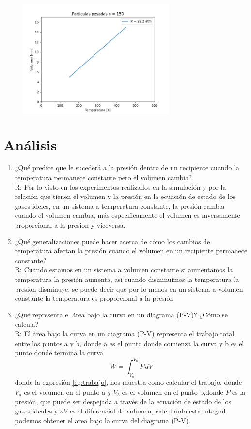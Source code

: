 \documentclass[]{article}
\begin{document}
\begin{figure}[H]
	\raggedright
	\includegraphics[width=8cm, height=6cm]{graficos/grafico9.pdf}
\end{figure}


\section{Análisis}
\begin{enumerate}
      \item ¿Qué predice que le sucederá a la presión dentro de un recipiente cuando la temperatura permanece constante pero el volumen cambia?\\
             R: Por lo visto en los experimentos realizados en la simulación y por la relación que tienen el volumen y la presión en la ecuación de estado de                los gases ideles, en un sistema a temperatura constante, la presión cambia cuando el volumen cambia, más especificamente el volumen es inversamente proporcional a la presion y viceversa.\\   
       \item ¿Qué generalizaciones puede hacer acerca de cómo los cambios de temperatura afectan la presión cuando el volumen en un recipiente permanece                                        constante?\\
             R: Cuando estamos en un sistema a volumen constante si aumentamos la temperatura la presión aumenta, asi cuando disminuimos la temperatura la presion disminuye, se puede decir que por lo menos en un sistema a volumen constante la temperatura es proporcional a la presión\\ 
      \item ¿Qué representa el área bajo la curva en un diagrama (P-V)? ¿Cómo se calcula?\\
             R: El área bajo la curva en un diagrama (P-V) representa el trabajo total entre los puntos a y b, donde a es el punto donde comienza la curva y b es el punto donde termina la curva
             \begin{equation}\label{eq:trabajo}
             W = \int_{V_a}^{V_b} \! P \, dV 
             \end{equation}
             donde la expresión \ref{eq:trabajo}, nos muestra como calcular el trabajo, donde $V_a$ es el volumen en el punto a y $V_b$ es el volumen en el punto b,donde $P$ es la presión, que puede ser despejada a través de la ecuación de estado de los gases ideales y $dV$ es el diferencial de volumen, calculando esta integral podemos obtener el area bajo la curva del diagrama (P-V).\\ 
\end{enumerate}
\end{document}
